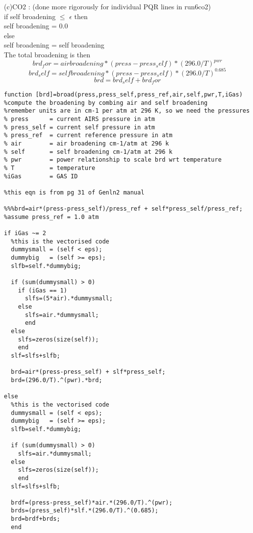 \documentclass[11pt]{article}
\begin{document}
(c)CO2 : (done more rigorously for individual PQR lines in run6co2)\\
            if self broadening $ \le $ $ \epsilon $ then\\
              self broadening = 0.0\\
            else\\
              self broadening = self broadening\\
The total broadening is then
\begin{displaymath}
  brd_for=air broadening*(press-press_self)*(296.0/T)^{pwr}
\end{displaymath}
\begin{displaymath}
  brd_self=self broadening*(press-press_self)*(296.0/T)^{0.685}
\end{displaymath}
\begin{displaymath}
  brd=brd_self+brd_for
\end{displaymath}

\begin{verbatim}
function [brd]=broad(press,press_self,press_ref,air,self,pwr,T,iGas)
%compute the broadening by combing air and self broadening
%remember units are in cm-1 per atm at 296 K, so we need the pressures
% press      = current AIRS pressure in atm
% press_self = current self pressure in atm
% press_ref  = current reference pressure in atm
% air        = air broadening cm-1/atm at 296 k
% self       = self broadening cm-1/atm at 296 k
% pwr        = power relationship to scale brd wrt temperature
% T          = temperature
%iGas        = GAS ID

%this eqn is from pg 31 of Genln2 manual

%%%brd=air*(press-press_self)/press_ref + self*press_self/press_ref;
%assume press_ref = 1.0 atm

if iGas ~= 2
  %this is the vectorised code
  dummysmall = (self < eps);
  dummybig   = (self >= eps);
  slfb=self.*dummybig;

  if (sum(dummysmall) > 0)
    if (iGas == 1)
      slfs=(5*air).*dummysmall;
    else
      slfs=air.*dummysmall;
      end
  else
    slfs=zeros(size(self));
    end
  slf=slfs+slfb;

  brd=air*(press-press_self) + slf*press_self;
  brd=(296.0/T).^(pwr).*brd;

else
  %this is the vectorised code
  dummysmall = (self < eps);
  dummybig   = (self >= eps);
  slfb=self.*dummybig;

  if (sum(dummysmall) > 0)
    slfs=air.*dummysmall;
  else
    slfs=zeros(size(self));
    end
  slf=slfs+slfb;

  brdf=(press-press_self)*air.*(296.0/T).^(pwr);
  brds=(press_self)*slf.*(296.0/T).^(0.685);
  brd=brdf+brds;
  end
\end{verbatim}
\end{document}
